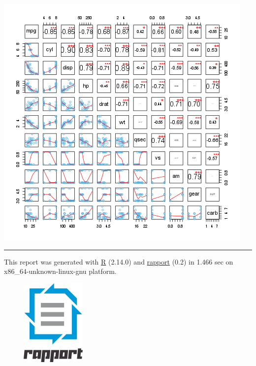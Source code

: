 \documentclass[]{article}
\makeatletter
\def\maxwidth{\ifdim\Gin@nat@width>\linewidth\linewidth
\else\Gin@nat@width\fi}
\let\Oldincludegraphics\includegraphics
\renewcommand{\includegraphics}[1]{\Oldincludegraphics[width=\maxwidth]{#1}}
\makeatother
\begin{document}
\href{82a0f381195bb4f50da3c943e264add1-hires.png}{\includegraphics{82a0f381195bb4f50da3c943e264add1.png}}

\begin{center}\rule{3in}{0.4pt}\end{center}

This report was generated with \href{http://www.r-project.org/}{R}
(2.14.0) and \href{http://al3xa.github.com/rapport/}{rapport} (0.2) in
1.466 sec on x86\_64-unknown-linux-gnu platform.

\begin{figure}[htbp]
\centering
\includegraphics{images/logo.png}
\caption{}
\end{figure}
\end{document}
